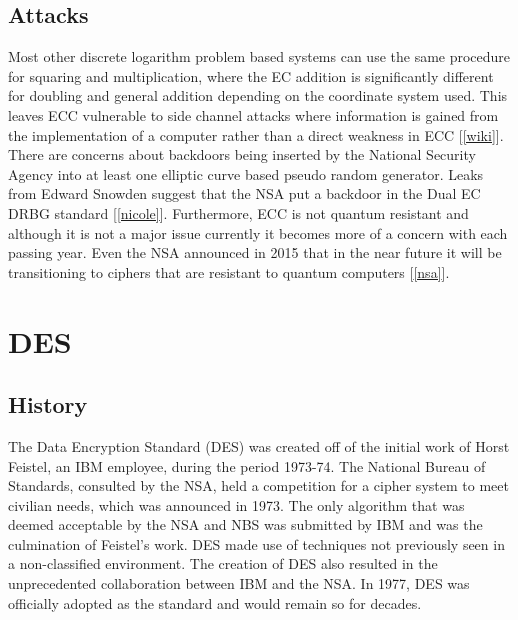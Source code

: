\documentclass[12pt]{article}
\begin{document}
\subsection{Attacks}
Most other discrete logarithm problem based systems can use the same procedure for squaring and multiplication, where the EC addition is significantly different for doubling and general addition depending on the coordinate system used. This leaves ECC vulnerable to side channel attacks where information is gained from the implementation of a computer rather than a direct weakness in ECC [\ref{wiki}]. There are concerns about backdoors being inserted by the National Security Agency into at least one elliptic curve based pseudo random generator. Leaks from Edward Snowden suggest that the NSA put a backdoor in the Dual EC DRBG standard [\ref{nicole}]. Furthermore, ECC is not quantum resistant and although it is not a major issue currently it becomes more of a concern with each passing year. Even the NSA announced in 2015 that in the near future it will be transitioning to ciphers that are resistant to quantum computers [\ref{nsa}].  

\section{DES}

\subsection{History}
The Data Encryption Standard (DES) was created off of the initial work of Horst Feistel, an IBM employee, during the period 1973-74. The National Bureau of Standards, consulted by the NSA, held a competition for a cipher system to meet civilian needs, which was announced in 1973. The only algorithm that was deemed acceptable by the NSA and NBS was submitted by IBM and was the culmination of Feistel's work. DES made use of techniques not previously seen in a non-classified environment. The creation of DES also resulted in the unprecedented collaboration between IBM and the NSA. In 1977, DES was officially adopted as the standard and would remain so for decades. 
\end{document}
